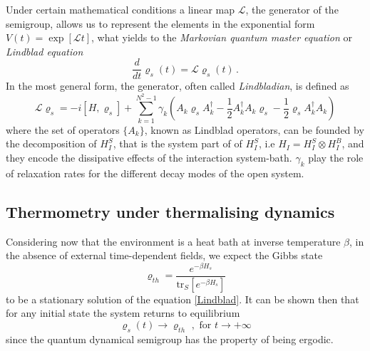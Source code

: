 Under certain mathematical conditions \cite{breuer2002open} a linear map $\mathcal{L}$, the generator of the semigroup, allows us to represent the elements in the exponential form $V(t)=\exp[\mathcal{L}t]$, what yields to the \textit{Markovian quantum master equation} or \textit{Lindblad equation}
\begin{equation}\label{Lindblad}
    \frac{d}{dt}\varrho_s(t)=\mathcal{L}\varrho_s(t)\,.
\end{equation}
In the most general form, the generator, often called \textit{Lindbladian}, is defined as
\begin{equation}
    \mathcal{L} \varrho_s = -i [H, \varrho_s] + \sum_{k=1}^{N^2-1} \gamma_k \left( A_k \varrho_s A_k^\dagger - \frac{1}{2} A_k^\dagger A_k \varrho_s - \frac{1}{2} \varrho_s A_k^\dagger A_k \right)
    \label{Superoperator}
\end{equation}
where the set of operators $\{A_k\}$, known as Lindblad operators, can be founded by the decomposition of $H_I^S$, that is the system part of of $H_I^S$, i.e $H_I = H_I^S \otimes H_I^B$, and they encode the dissipative effects of the interaction system-bath. $\gamma_k$ play the role of relaxation rates for the different decay modes of the open system.

\subsection{Thermometry under thermalising dynamics}\label{Thermalising}
Considering now that the environment is a heat bath at inverse temperature $\beta$, in the absence of external time-dependent fields, we expect the Gibbs state
\begin{equation}\label{rho th}
    \varrho_{th}=\frac{e^{-\beta H_s}}{\text{tr}_S [e^{-\beta H_s}]}
\end{equation}
to be a stationary solution of the equation \eqref{Lindblad}. It can be shown then that for any initial state the system returns to equilibrium
\begin{equation}
    \varrho_s(t)\xrightarrow{} \varrho_{th}\,\,,\,\, \text{for}\,\,t\rightarrow +\infty
\end{equation}
since the quantum dynamical semigroup has the property of being ergodic.

